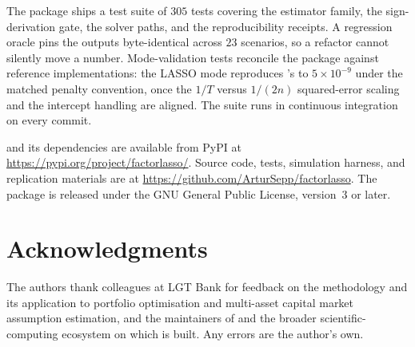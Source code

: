 \documentclass[article]{jss}
\begin{document}
The package ships a test suite of $305$ tests covering the estimator family,
the sign-derivation gate, the solver paths, and the reproducibility receipts. A
regression oracle pins the  outputs byte-identical across $23$
scenarios, so a refactor cannot silently move a number. Mode-validation tests
reconcile the package against reference implementations: the LASSO mode
reproduces 's  to $5 \times 10^{-9}$ under the
matched penalty convention, once the $1/T$ versus $1/(2n)$ squared-error scaling
and the intercept handling are aligned. The suite runs in continuous
integration on every commit.

 and its dependencies are available from PyPI at
\url{https://pypi.org/project/factorlasso/}. Source code, tests,
simulation harness, and replication materials are at
\url{https://github.com/ArturSepp/factorlasso}. The package is released
under the GNU General Public License, version~3 or later.


\section*{Acknowledgments}

The authors thank colleagues at LGT Bank for feedback on the methodology
and its application to portfolio optimisation and multi-asset capital market assumption estimation,
and the maintainers of  and the broader 
scientific-computing ecosystem on which  is built. Any
errors are the author's own.







\newpage
\end{document}

